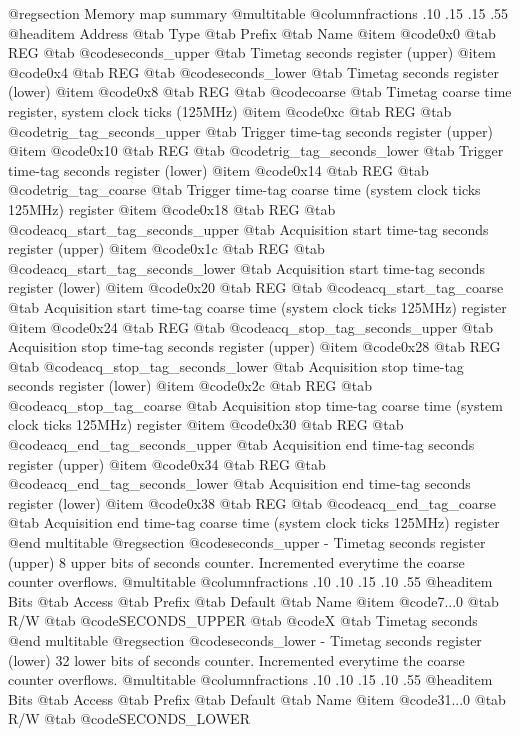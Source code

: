 @regsection Memory map summary
@multitable  @columnfractions .10 .15 .15 .55
@headitem Address @tab Type @tab Prefix @tab Name
@item @code{0x0} @tab
REG @tab
@code{seconds_upper} @tab
Timetag seconds register (upper)
@item @code{0x4} @tab
REG @tab
@code{seconds_lower} @tab
Timetag seconds register (lower)
@item @code{0x8} @tab
REG @tab
@code{coarse} @tab
Timetag coarse time register, system clock ticks (125MHz)
@item @code{0xc} @tab
REG @tab
@code{trig_tag_seconds_upper} @tab
Trigger time-tag seconds register (upper)
@item @code{0x10} @tab
REG @tab
@code{trig_tag_seconds_lower} @tab
Trigger time-tag seconds register (lower)
@item @code{0x14} @tab
REG @tab
@code{trig_tag_coarse} @tab
Trigger time-tag coarse time (system clock ticks 125MHz) register
@item @code{0x18} @tab
REG @tab
@code{acq_start_tag_seconds_upper} @tab
Acquisition start time-tag seconds register (upper)
@item @code{0x1c} @tab
REG @tab
@code{acq_start_tag_seconds_lower} @tab
Acquisition start time-tag seconds register (lower)
@item @code{0x20} @tab
REG @tab
@code{acq_start_tag_coarse} @tab
Acquisition start time-tag coarse time (system clock ticks 125MHz) register
@item @code{0x24} @tab
REG @tab
@code{acq_stop_tag_seconds_upper} @tab
Acquisition stop time-tag seconds register (upper)
@item @code{0x28} @tab
REG @tab
@code{acq_stop_tag_seconds_lower} @tab
Acquisition stop time-tag seconds register (lower)
@item @code{0x2c} @tab
REG @tab
@code{acq_stop_tag_coarse} @tab
Acquisition stop time-tag coarse time (system clock ticks 125MHz) register
@item @code{0x30} @tab
REG @tab
@code{acq_end_tag_seconds_upper} @tab
Acquisition end time-tag seconds register (upper)
@item @code{0x34} @tab
REG @tab
@code{acq_end_tag_seconds_lower} @tab
Acquisition end time-tag seconds register (lower)
@item @code{0x38} @tab
REG @tab
@code{acq_end_tag_coarse} @tab
Acquisition end time-tag coarse time (system clock ticks 125MHz) register
@end multitable 
@regsection @code{seconds_upper} - Timetag seconds register (upper)
8 upper bits of seconds counter. Incremented everytime the coarse counter overflows.
@multitable @columnfractions .10 .10 .15 .10 .55
@headitem Bits @tab Access @tab Prefix @tab Default @tab Name
@item @code{7...0}
@tab R/W @tab
@code{SECONDS_UPPER}
@tab @code{X} @tab 
Timetag seconds
@end multitable
@regsection @code{seconds_lower} - Timetag seconds register (lower)
32 lower bits of seconds counter. Incremented everytime the coarse counter overflows.
@multitable @columnfractions .10 .10 .15 .10 .55
@headitem Bits @tab Access @tab Prefix @tab Default @tab Name
@item @code{31...0}
@tab R/W @tab
@code{SECONDS_LOWER}
